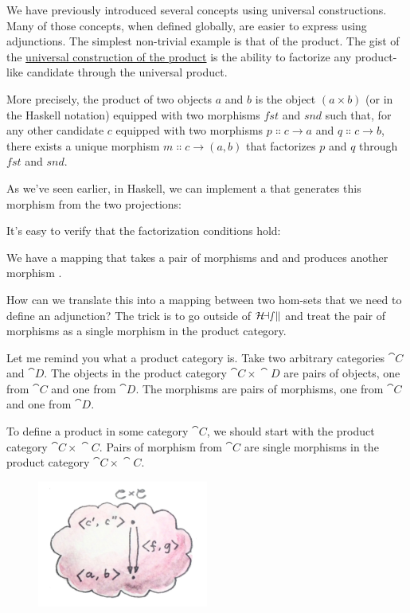 We have previously introduced several concepts using universal
constructions. Many of those concepts, when defined globally, are easier
to express using adjunctions. The simplest non-trivial example is that
of the product. The gist of the \hyperref[products-and-coproducts]{universal
construction of the product} is the ability to factorize any
product-like candidate through the universal product.

More precisely, the product of two objects $a$ and $b$ is
the object $(a\times{}b)$ (or  in the Haskell
notation) equipped with two morphisms $fst$ and $snd$ such
that, for any other candidate $c$ equipped with two morphisms
$p \Colon c \to a$ and $q \Colon c \to b$, there
exists a unique morphism $m \Colon c \to (a, b)$ that
factorizes $p$ and $q$ through $fst$ and $snd$.

As we've seen earlier, in Haskell, we can implement a  that generates this
morphism from the two projections:

It's easy to verify that the factorization conditions hold:

We have a mapping that takes a pair of morphisms  and
 and produces another morphism
.

How can we translate this into a mapping between two hom-sets that we
need to define an adjunction? The trick is to go outside of
$\mathcal{H\mkern-3mu ask}$ and treat the pair of morphisms as a single morphism in
the product category.

Let me remind you what a product category is. Take two arbitrary
categories $\cat{C}$ and $\cat{D}$. The objects in the product category
$\cat{C}\times{}\cat{D}$ are pairs of objects, one from $\cat{C}$ and one from
$\cat{D}$. The morphisms are pairs of morphisms, one from $\cat{C}$ and
one from $\cat{D}$.

To define a product in some category $\cat{C}$, we should start with the
product category $\cat{C}\times{}\cat{C}$. Pairs of morphism from $\cat{C}$ are single
morphisms in the product category $\cat{C}\times{}\cat{C}$.

\begin{figure}[H]
\centering
\includegraphics[width=0.5\textwidth]{images/adj-productcat.jpg}
\end{figure}

